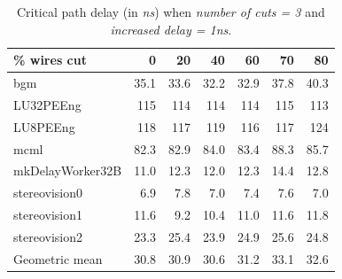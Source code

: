 \documentclass{sig-alternate-2013}
\begin{document}
\begin{table}[!htbp]
\begin{tabular}{|l|r|r|r|r|r|r|}
\hline
\% wires cut & 0 & 20 & 40 & 60 & 70 & 80 \\ \hline \hline
bgm & 35.1 & 33.6 & 32.2 & 32.9 & 37.8 & 40.3 \\ \hline
LU32PEEng & 115 & 114 & 114 & 114 & 115 & 113 \\ \hline
LU8PEEng & 118 & 117 & 119 & 116 & 117 & 124 \\ \hline
mcml & 82.3 & 82.9 & 84.0 & 83.4 & 88.3 & 85.7 \\ \hline
mkDelayWorker32B & 11.0 & 12.3 & 12.0 & 12.3 & 14.4 & 12.8 \\ \hline
stereovision0 & 6.9 & 7.8 & 7.0 & 7.4 & 7.6 & 7.0 \\ \hline
stereovision1 & 11.6 & 9.2 & 10.4 & 11.0 & 11.6 & 11.8 \\ \hline
stereovision2 & 23.3 & 25.4 & 23.9 & 24.9 & 25.6 & 24.8 \\ \hline
Geometric mean & 30.8 & 30.9 & 30.6 & 31.2 & 33.1 & 32.6 \\ \hline
\end{tabular}
\caption{Critical path delay (in \textit{ns}) when \textit{number of cuts = 3} and \textit{increased delay = 1ns}.}
\label{table:standard_path}
\end{table}


\end{document}
